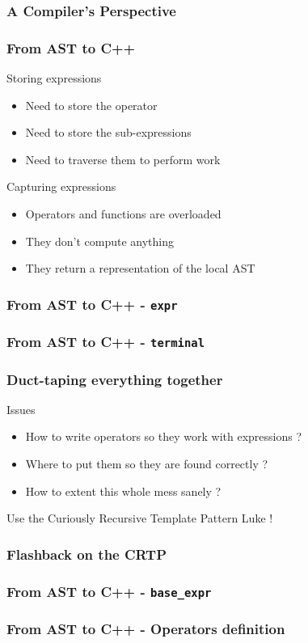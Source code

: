 \begin{frame}
\frametitle{A Compiler's Perspective}
\begin{center}\end{center}
\end{frame}

\begin{frame}
\frametitle{From AST to C++}
\begin{block}{Storing expressions}
\begin{itemize}
\item Need to store the \alert{operator}
\item Need to store the \alert{sub-expressions}
\item Need to traverse them to perform work
\end{itemize}
\end{block}{}

\begin{block}{Capturing expressions}
\begin{itemize}
\item Operators and functions are overloaded
\item They don't compute anything
\item They return a \alert{representation} of the local AST
\end{itemize}
\end{block}{}
\end{frame}

\begin{frame}
\frametitle{From AST to C++ - \texttt{expr}}
\end{frame}

\begin{frame}
\frametitle{From AST to C++ - \texttt{terminal}}
\lstterminal
\end{frame}

\begin{frame}
\frametitle{Duct-taping everything together}
\begin{block}{Issues}
\begin{itemize}
\item How to write operators so they work with expressions ?
\item Where to put them so they are found correctly ?
\item How to extent this whole mess sanely ?
\end{itemize}
\end{block}{}

{
\begin{center}
Use the \alert{Curiously Recursive Template Pattern} Luke !
\end{center}
}
\end{frame}

\begin{frame}
\frametitle{Flashback on the CRTP}
\lstcrtp
\end{frame}

\begin{frame}
\frametitle{From AST to C++ - \texttt{base\_expr}}
\lstcrtpexpr
\end{frame}

\begin{frame}
\frametitle{From AST to C++ - Operators definition}
\lstcrtpop
\end{frame}

